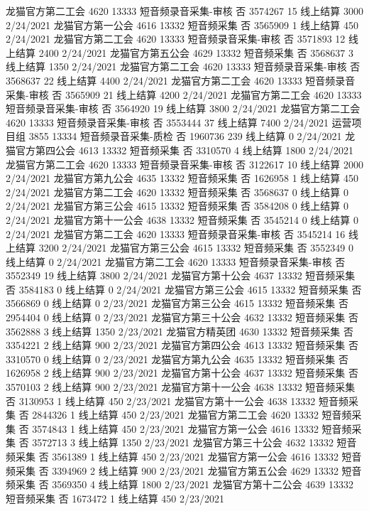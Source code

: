 龙猫官方第二工会	4620	13333	短音频录音采集-审核	否	3574267	15	线上结算	3000	2/24/2021
龙猫官方第一公会	4616	13332	短音频采集	否	3565909	1	线上结算	450	2/24/2021
龙猫官方第二工会	4620	13333	短音频录音采集-审核	否	3571893	12	线上结算	2400	2/24/2021
龙猫官方第五公会	4629	13332	短音频采集	否	3568637	3	线上结算	1350	2/24/2021
龙猫官方第二工会	4620	13333	短音频录音采集-审核	否	3568637	22	线上结算	4400	2/24/2021
龙猫官方第二工会	4620	13333	短音频录音采集-审核	否	3565909	21	线上结算	4200	2/24/2021
龙猫官方第二工会	4620	13333	短音频录音采集-审核	否	3564920	19	线上结算	3800	2/24/2021
龙猫官方第二工会	4620	13333	短音频录音采集-审核	否	3553444	37	线上结算	7400	2/24/2021
运营项目组	3855	13334	短音频录音采集-质检	否	1960736	239	线上结算	0	2/24/2021
龙猫官方第四公会	4613	13332	短音频采集	否	3310570	4	线上结算	1800	2/24/2021
龙猫官方第二工会	4620	13333	短音频录音采集-审核	否	3122617	10	线上结算	2000	2/24/2021
龙猫官方第九公会	4635	13332	短音频采集	否	1626958	1	线上结算	450	2/24/2021
龙猫官方第二工会	4620	13332	短音频采集	否	3568637	0	线上结算	0	2/24/2021
龙猫官方第三公会	4615	13332	短音频采集	否	3584208	0	线上结算	0	2/24/2021
龙猫官方第十一公会	4638	13332	短音频采集	否	3545214	0	线上结算	0	2/24/2021
龙猫官方第二工会	4620	13333	短音频录音采集-审核	否	3545214	16	线上结算	3200	2/24/2021
龙猫官方第三公会	4615	13332	短音频采集	否	3552349	0	线上结算	0	2/24/2021
龙猫官方第二工会	4620	13333	短音频录音采集-审核	否	3552349	19	线上结算	3800	2/24/2021
龙猫官方第十公会	4637	13332	短音频采集	否	3584183	0	线上结算	0	2/24/2021
龙猫官方第三公会	4615	13332	短音频采集	否	3566869	0	线上结算	0	2/23/2021
龙猫官方第三公会	4615	13332	短音频采集	否	2954404	0	线上结算	0	2/23/2021
龙猫官方第三十公会	4632	13332	短音频采集	否	3562888	3	线上结算	1350	2/23/2021
龙猫官方精英团	4630	13332	短音频采集	否	3354221	2	线上结算	900	2/23/2021
龙猫官方第四公会	4613	13332	短音频采集	否	3310570	0	线上结算	0	2/23/2021
龙猫官方第九公会	4635	13332	短音频采集	否	1626958	2	线上结算	900	2/23/2021
龙猫官方第十公会	4637	13332	短音频采集	否	3570103	2	线上结算	900	2/23/2021
龙猫官方第十一公会	4638	13332	短音频采集	否	3130953	1	线上结算	450	2/23/2021
龙猫官方第十一公会	4638	13332	短音频采集	否	2844326	1	线上结算	450	2/23/2021
龙猫官方第二工会	4620	13332	短音频采集	否	3574843	1	线上结算	450	2/23/2021
龙猫官方第一公会	4616	13332	短音频采集	否	3572713	3	线上结算	1350	2/23/2021
龙猫官方第三十公会	4632	13332	短音频采集	否	3561389	1	线上结算	450	2/23/2021
龙猫官方第一公会	4616	13332	短音频采集	否	3394969	2	线上结算	900	2/23/2021
龙猫官方第五公会	4629	13332	短音频采集	否	3569350	4	线上结算	1800	2/23/2021
龙猫官方第十二公会	4639	13332	短音频采集	否	1673472	1	线上结算	450	2/23/2021
